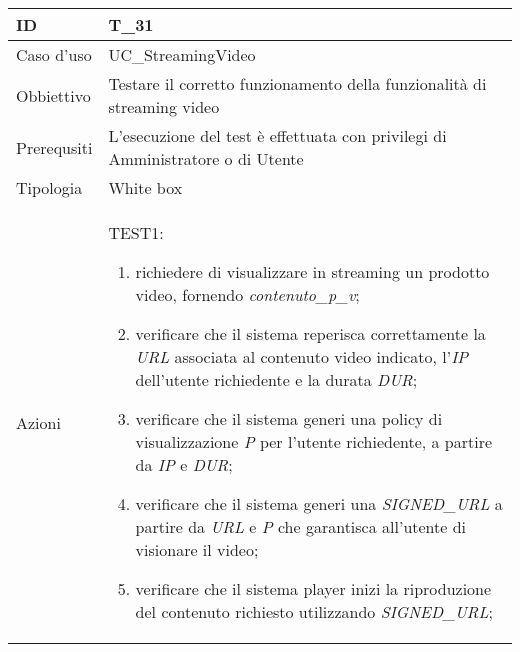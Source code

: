\begin{table}[hb]
    \centering
    \begin{tabular}{ |p{2cm}|p{10cm}|  }
        \hline
        ID          & T\_31                                                                          \\\hline
        Caso d'uso  & UC\_StreamingVideo                                                             \\\hline
        Obbiettivo  & Testare il corretto funzionamento della funzionalità di streaming video        \\\hline
        Prerequsiti & L'esecuzione del test è effettuata con privilegi di Amministratore o di Utente \\\hline
        Tipologia   & White box                                                                      \\\hline
        Azioni      &
        TEST1:
        \begin{enumerate}[nosep, topsep=0pt]
            \item richiedere di visualizzare in streaming un prodotto video, fornendo \emph{contenuto\_p\_v};
            \item verificare che il sistema reperisca correttamente la \emph{URL} associata al contenuto video indicato, l'\emph{IP} dell'utente richiedente e la durata \emph{DUR};
            \item verificare che il sistema generi una policy di visualizzazione \emph{P} per l'utente richiedente, a partire da \emph{IP} e \emph{DUR};
            \item verificare che il sistema generi una \emph{SIGNED\_URL} a partire da \emph{URL} e \emph{P} che garantisca all'utente di visionare il video;
            \item verificare che il sistema player inizi la riproduzione del contenuto richiesto utilizzando \emph{SIGNED\_URL};
        \end{enumerate}
        \\\hline
    \end{tabular}
\end{table}

